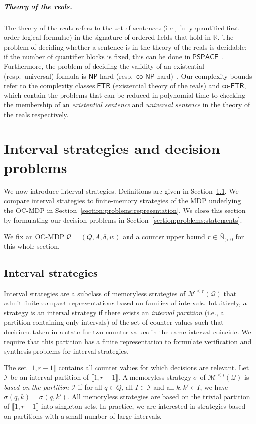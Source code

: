 \documentclass[a4paper,UKenglish,cleveref,autoref,thm-restate,colorlinks]{lipics-v2021}
\newcommand{\integerInterval}[1]{\llbracket{}#1\rrbracket{}}
\newcommand{\pspace}{\textsf{PSPACE}}
\newcommand{\np}{\textsf{NP}}
\newcommand{\coNP}{\textsf{co-NP}}
\newcommand{\etr}{\textsf{ETR}}
\newcommand{\coetr}{\textsf{co-ETR}}
\newcommand{\IR}{\mathbb{R}}
\newcommand{\IN}{\mathbb{N}}
\newcommand{\INposBar}{\bar{\IN}_{>0}}
\newcommand{\mdp}{\mathcal{M}}
\newcommand{\weight}{w}
\newcommand{\ocmdp}{\mathcal{Q}}
\newcommand{\ocmdpFin}[2]{\mdp^{\leq #2}(#1)}
\newcommand{\ocStateSpace}{Q}
\newcommand{\ocState}{q}
\newcommand{\ocCount}{k}
\newcommand{\ocActionSpace}{A}
\newcommand{\ocTrans}{\delta}
\newcommand{\ocTuple}{(\ocStateSpace, \ocActionSpace, \ocTrans, \weight)}
\newcommand{\counterUB}{r}
\newcommand{\intPart}{\mathcal{I}}
\newcommand{\interval}{I}
\newcommand{\stratGeneric}[1]{{\sigma_{#1}}}
\newcommand{\strat}{\stratGeneric{}}
\begin{document}
\subparagraph*{Theory of the reals.}
The theory of the reals refers to the set of sentences (i.e., fully quantified first-order logical formulae) in the signature of ordered fields that hold in $\IR$.
The problem of deciding whether a sentence is in the theory of the reals is decidable; if the number of quantifier blocks is fixed, this can be done in $\pspace$~\cite[Rmk.~13.10]{BPR2006}.
Furthermore, the problem of deciding the validity of an existential (resp.~universal) formula is $\np$-hard (resp.~$\coNP$-hard)~\cite[Rmk.~13.9]{BPR2006}.
Our complexity bounds refer to the complexity classes $\etr$ (existential theory of the reals) and $\coetr$, which contain the problems that can be reduced in polynomial time to checking the membership of an \textit{existential sentence} and \textit{universal sentence} in the theory of the reals respectively.

 
\section{Interval strategies and decision problems}\label{section:problems}
We now introduce interval strategies.
Definitions are given in Section~\ref{section:problems:definition}.
We compare interval strategies to finite-memory strategies of the MDP underlying the OC-MDP in Section~\ref{section:problems:representation}.
We close this section by formulating our decision problems in Section~\ref{section:problems:statements}.

We fix an OC-MDP $\ocmdp = \ocTuple$ and a counter upper bound $\counterUB\in\INposBar$ for this whole section.

\subsection{Interval strategies}\label{section:problems:definition}
Interval strategies are a subclass of memoryless strategies of $\ocmdpFin{\ocmdp}{\counterUB}$ that admit finite compact representations based on families of intervals.
Intuitively, a strategy is an interval strategy if there exists an \textit{interval partition} (i.e., a partition containing only intervals) of the set of counter values such that decisions taken in a state for two counter values in the same interval coincide.
We require that this partition has a finite representation to formulate verification and synthesis problems for interval strategies.

The set $\integerInterval{1, \counterUB-1}$ contains all counter values for which decisions are relevant.
Let $\intPart$ be an interval partition of $\integerInterval{1, \counterUB-1}$.
A memoryless strategy $\strat$ of $\ocmdpFin{\ocmdp}{\counterUB}$ is \textit{based on the partition $\intPart$} if for all $\ocState\in\ocStateSpace$, all $\interval\in\intPart$ and all $\ocCount, \ocCount'\in\interval$, we have $\strat(\ocState, \ocCount) = \strat(\ocState, \ocCount')$.
All memoryless strategies are based on the trivial partition of $\integerInterval{1, \counterUB-1}$ into singleton sets.
In practice, we are interested in strategies based on partitions with a small number of large intervals.
\end{document}

